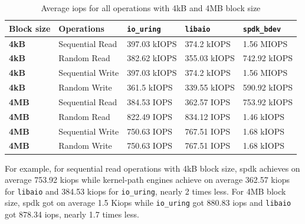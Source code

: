     \begin{table}[htbp]
        \centering
        \caption{Average \acrshort{iops} for all operations with 4kB and 4MB block size}
        \label{tab:stats-iops}
            \begin{tabularx}{\columnwidth}{@{}l l X X X@{}}
            \toprule
            \textbf{Block size} & \textbf{Operations} & \texttt{io\_uring} & \texttt{libaio} & \texttt{spdk\_bdev}\\
            \midrule
            \textbf{4kB} & Sequential Read & 397.03 kIOPS & 374.2 kIOPS & 1.56 MIOPS \\
            \textbf{4kB} & Random Read & 382.62 kIOPS & 355.03 kIOPS & 742.92 kIOPS \\
            \textbf{4kB} & Sequential Write & 397.03 kIOPS & 374.2 kIOPS & 1.56 MIOPS \\
            \textbf{4kB} & Random Write & 361.5 kIOPS & 339.55 kIOPS & 590.92 kIOPS \\
            \midrule
            \textbf{4MB} & Sequential Read & 384.53 IOPS & 362.57 IOPS & 753.92 kIOPS \\
            \textbf{4MB} & Random Read & 822.49 IOPS & 834.12 IOPS & 1.46 kIOPS \\
            \textbf{4MB} & Sequential Write & 750.63 IOPS & 767.51 IOPS & 1.68 kIOPS \\
            \textbf{4MB} & Random Write & 750.63 IOPS & 767.51 IOPS & 1.68 kIOPS \\
            \bottomrule
            \end{tabularx}
    \end{table}



    For example, for sequential read operations with 4kB block size, \acrshort{spdk} achieves on average 753.92 k\acrshort{iops} while kernel-path engines achieve on average 362.57 k\acrshort{iops} for \texttt{libaio} and 384.53 k\acrshort{iops} for \texttt{io\_uring}, nearly 2 times less. For 4MB block size, \acrshort{spdk} got on average 1.5 K\acrshort{iops} while \texttt{io\_uring} got 880.83 \acrshort{iops} and \texttt{libaio} got 878.34 \acrshort{iops}, nearly 1.7 times less.

